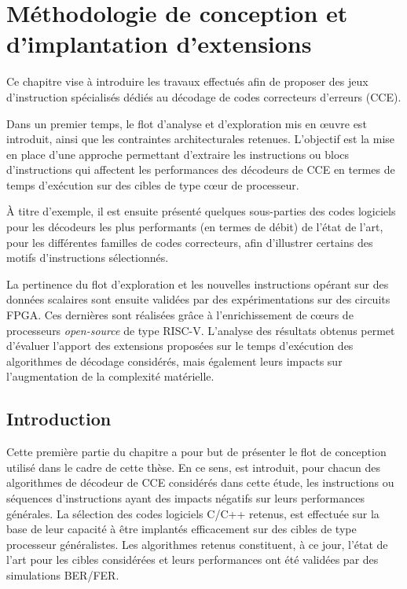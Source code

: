 \documentclass[../main.tex]{subfiles}
\begin{document}
%
%
%
\chapter{Méthodologie de conception et d'implantation d'extensions} 
\label{chapter:3}
%
% 
%
%
%

Ce chapitre vise à introduire les travaux effectués afin de proposer des jeux d'instruction spécialisés dédiés au décodage de codes correcteurs d'erreurs (CCE). 

Dans un premier temps, le flot d'analyse et d'exploration mis en œuvre est introduit, ainsi que les contraintes architecturales retenues. L'objectif est la mise en place d'une approche permettant d'extraire les instructions ou blocs d'instructions qui affectent les performances des décodeurs de CCE en termes de temps d'exécution sur des cibles de type cœur de processeur. 

À titre d'exemple, il est ensuite présenté quelques sous-parties des codes logiciels pour les décodeurs les plus performants (en termes de débit) de l'état de l'art, pour les différentes familles de codes correcteurs, afin d'illustrer certains des motifs d'instructions sélectionnés. 

La pertinence du flot d'exploration et les nouvelles instructions opérant sur des données scalaires sont ensuite validées par des expérimentations sur des circuits FPGA. Ces dernières sont réalisées grâce à l'enrichissement de cœurs de processeurs \textit{open-source} de type RISC-V. 
L'analyse des résultats obtenus permet d'évaluer l'apport des extensions proposées sur le temps d'exécution des algorithmes de décodage considérés, mais également leurs impacts sur l'augmentation de la complexité matérielle. 



\etocsettocstyle{{\large \hspace{-1.5 em} \textbf{} \hfill}\vspace{-2.5 em}\\\par\noindent\rule{\linewidth}{1 pt}\vspace{-.2 em}}{\par\noindent\rule{\linewidth}{1 pt}\\}
\localtableofcontents
%
%
%
%
%
\section{Introduction}
%
%
%
%
%
%
Cette première partie du chapitre a pour but de présenter le flot de conception utilisé dans le cadre de cette thèse. 
En ce sens, est introduit, pour chacun des algorithmes de décodeur de CCE considérés dans cette étude, les instructions ou séquences d'instructions ayant des impacts négatifs sur leurs performances générales. 
La sélection des codes logiciels C/C++ retenus, est effectuée sur la base de leur capacité à être implantés efficacement sur des cibles de type processeur généralistes. 
Les algorithmes retenus constituent, à ce jour, l'état de l'art pour les cibles considérées et leurs performances ont été validées par des simulations BER/FER. 
\end{document}
